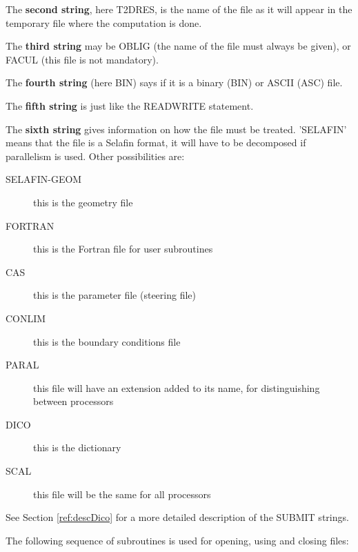 The \textbf{second string}, here T2DRES, is the name of the file as it will
appear in the temporary file where the computation is done.

The \textbf{third string} may be OBLIG (the name of the file must always be
given), or FACUL (this file is not mandatory).

The \textbf{fourth string} (here BIN) says if it is a binary (BIN) or ASCII
(ASC) file.

The \textbf{fifth string} is just like the READWRITE statement.

The \textbf{sixth string} gives
information on how the file must be treated. 'SELAFIN' means that the file is a
Selafin format, it will have to be decomposed if parallelism is used. Other
possibilities are:
\begin{description}
  \item [SELAFIN-GEOM] this is the geometry file
  \item [FORTRAN] this is the Fortran file for user subroutines
  \item [CAS] this is the parameter file (steering file)
  \item [CONLIM] this is the boundary conditions file
  \item [PARAL] this file will have an extension added to its name, for
    distinguishing between processors
  \item [DICO] this is the dictionary
  \item [SCAL] this file will be the same for all processors
\end{description}
See Section \ref{ref:descDico} for a more detailed description of the SUBMIT
strings.

The following sequence of subroutines is used for opening, using and closing
files:

